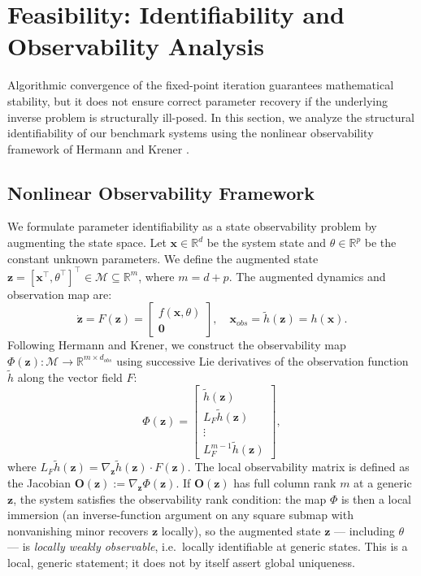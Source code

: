 \section{Feasibility: Identifiability and Observability Analysis}
\label{sec:identifiability}

Algorithmic convergence of the fixed-point iteration guarantees mathematical stability, but it does not ensure correct parameter recovery if the underlying inverse problem is structurally ill-posed. In this section, we analyze the structural identifiability of our benchmark systems using the nonlinear observability framework of Hermann and Krener \cite{hermann1977nonlinear}.

\subsection{Nonlinear Observability Framework}
We formulate parameter identifiability as a state observability problem by augmenting the state space. Let $\mathbf{x} \in \mathbb{R}^d$ be the system state and $\theta \in \mathbb{R}^p$ be the constant unknown parameters. We define the augmented state $\mathbf{z} = [\mathbf{x}^\top, \theta^\top]^\top \in \mathcal{M} \subseteq \mathbb{R}^{m}$, where $m = d+p$. The augmented dynamics and observation map are:
\begin{equation}
    \dot{\mathbf{z}} = F(\mathbf{z}) = \begin{bmatrix} f(\mathbf{x}, \theta) \\ \mathbf{0} \end{bmatrix}, \quad \mathbf{x}_{obs} = \tilde{h}(\mathbf{z}) = h(\mathbf{x}).
\end{equation}
Following Hermann and Krener, we construct the observability map $\Phi(\mathbf{z}): \mathcal{M} \to \mathbb{R}^{m \times d_{obs}}$ using successive Lie derivatives of the observation function $\tilde{h}$ along the vector field $F$:
\begin{equation}
    \Phi(\mathbf{z}) = \begin{bmatrix} \tilde{h}(\mathbf{z}) \\ L_{F} \tilde{h}(\mathbf{z}) \\ \vdots \\ L_{F}^{m-1} \tilde{h}(\mathbf{z}) \end{bmatrix},
\end{equation}
where $L_F \tilde{h}(\mathbf{z}) = \nabla_{\mathbf{z}} \tilde{h}(\mathbf{z}) \cdot F(\mathbf{z})$. 
The local observability matrix is defined as the Jacobian $\mathbf{O}(\mathbf{z}) := \nabla_{\mathbf{z}} \Phi(\mathbf{z})$. If $\mathbf{O}(\mathbf{z})$ has full column rank $m$ at a generic $\mathbf{z}$, the system satisfies the observability rank condition: the map $\Phi$ is then a local immersion (an inverse-function argument on any square submap with nonvanishing minor recovers $\mathbf{z}$ locally), so the augmented state $\mathbf{z}$ --- including $\theta$ --- is \emph{locally weakly observable}, i.e.\ locally identifiable at generic states. This is a local, generic statement; it does not by itself assert global uniqueness.

